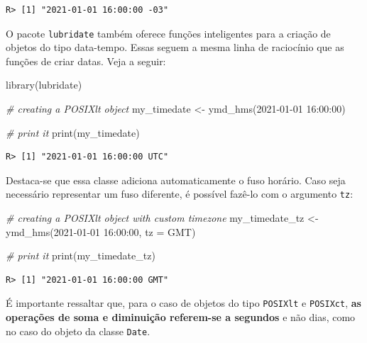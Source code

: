 \documentclass[
  11pt,
]{book}
\newenvironment{Shaded}{\begin{snugshade}}{\end{snugshade}}
\newcommand{\AttributeTok}[1]{\textcolor[rgb]{0.61,0.61,0.61}{#1}}
\newcommand{\CommentTok}[1]{\textcolor[rgb]{0.37,0.37,0.37}{\textit{#1}}}
\newcommand{\FunctionTok}[1]{\textcolor[rgb]{0,0,0}{#1}}
\newcommand{\NormalTok}[1]{#1}
\newcommand{\OtherTok}[1]{\textcolor[rgb]{0.37,0.37,0.37}{#1}}
\newcommand{\StringTok}[1]{\textcolor[rgb]{0.5,0.5,0.5}{#1}}
\begin{document}
\begin{verbatim}
R> [1] "2021-01-01 16:00:00 -03"
\end{verbatim}

O pacote \texttt{lubridate} também oferece funções inteligentes para a criação de objetos do tipo data-tempo. Essas seguem a mesma linha de raciocínio que as funções de criar datas. Veja a seguir:

\begin{Shaded}
\begin{Highlighting}[]
\FunctionTok{library}\NormalTok{(lubridate)}

\CommentTok{\# creating a POSIXlt object}
\NormalTok{my\_timedate }\OtherTok{\textless{}{-}} \FunctionTok{ymd\_hms}\NormalTok{(}\StringTok{\textquotesingle{}2021{-}01{-}01 16:00:00\textquotesingle{}}\NormalTok{)}

\CommentTok{\# print it}
\FunctionTok{print}\NormalTok{(my\_timedate)}
\end{Highlighting}
\end{Shaded}

\begin{verbatim}
R> [1] "2021-01-01 16:00:00 UTC"
\end{verbatim}

Destaca-se que essa classe adiciona automaticamente o fuso horário. Caso seja necessário representar um fuso diferente, é possível fazê-lo com o argumento \texttt{tz}:

\begin{Shaded}
\begin{Highlighting}[]
\CommentTok{\# creating a POSIXlt object with custom timezone}
\NormalTok{my\_timedate\_tz }\OtherTok{\textless{}{-}} \FunctionTok{ymd\_hms}\NormalTok{(}\StringTok{\textquotesingle{}2021{-}01{-}01 16:00:00\textquotesingle{}}\NormalTok{,}
                          \AttributeTok{tz =} \StringTok{\textquotesingle{}GMT\textquotesingle{}}\NormalTok{)}

\CommentTok{\# print it}
\FunctionTok{print}\NormalTok{(my\_timedate\_tz)}
\end{Highlighting}
\end{Shaded}

\begin{verbatim}
R> [1] "2021-01-01 16:00:00 GMT"
\end{verbatim}

É importante ressaltar que, para o caso de objetos do tipo \texttt{POSIXlt} e \texttt{POSIXct}, \textbf{as operações de soma e diminuição referem-se a segundos} e não dias, como no caso do objeto da classe \texttt{Date}.
\end{document}
